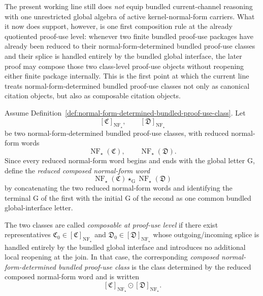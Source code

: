 \begin{remark}
\label{rem:status-of-the-first-proof-use-class-composition-step}
The present working line still does \emph{not} equip bundled current-channel reasoning with one unrestricted global algebra of active kernel-normal-form carriers. What it now does support, however, is one first composition rule at the already quotiented proof-use level: whenever two finite bundled proof-use packages have already been reduced to their normal-form-determined bundled proof-use classes and their splice is handled entirely by the bundled global interface, the later proof may compose those two class-level proof-use objects without reopening either finite package internally. This is the first point at which the current line treats normal-form-determined bundled proof-use classes not only as canonical citation objects, but also as composable citation objects.
\end{remark}

\begin{definition}
\label{def:composable-normal-form-determined-bundled-proof-use-classes}
Assume Definition~\ref{def:normal-form-determined-bundled-proof-use-class}. Let
\[
[\mathfrak C]_{\operatorname{NF}_{\star}},\qquad
[\mathfrak D]_{\operatorname{NF}_{\star}}
\]
be two normal-form-determined bundled proof-use classes, with reduced normal-form words
\[
\operatorname{NF}_{\star}(\mathfrak C),\qquad \operatorname{NF}_{\star}(\mathfrak D).
\]
Since every reduced normal-form word begins and ends with the global letter \(\mathrm G\), define the \emph{reduced composed normal-form word}
\[
\operatorname{NF}_{\star}(\mathfrak C)\star_{\mathrm G}\operatorname{NF}_{\star}(\mathfrak D)
\]
by concatenating the two reduced normal-form words and identifying the terminal \(\mathrm G\) of the first with the initial \(\mathrm G\) of the second as one common bundled global-interface letter.

The two classes are called \emph{composable at proof-use level} if there exist representatives \(\mathfrak C_0\in[\mathfrak C]_{\operatorname{NF}_{\star}}\) and \(\mathfrak D_0\in[\mathfrak D]_{\operatorname{NF}_{\star}}\) whose outgoing/incoming splice is handled entirely by the bundled global interface and introduces no additional local reopening at the join. In that case, the corresponding \emph{composed normal-form-determined bundled proof-use class} is the class determined by the reduced composed normal-form word and is written
\[
[\mathfrak C]_{\operatorname{NF}_{\star}}\odot[\mathfrak D]_{\operatorname{NF}_{\star}}.
\]
\end{definition}

